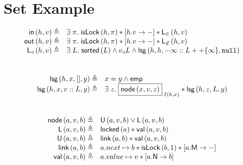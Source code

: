\section*{Set Example}
%
%
\[
\begin{array}{r l}
	\inSet{h}{v} \eqdef & \exsts{\pi} \isLock{h}{\pi} * \valueC{h}{v} * \inList{h}{v}\\
	\outSet{h}{v} \eqdef & \exsts{\pi} \isLock{h}{\pi} * \valueC{h}{v} * \outList{h}{v}\\
	\sortedList{\triangleleft}{h}{v} \eqdef & \exsts{L} \sorted{L} \land v  _\triangleleft L \land \lsg{h}{h}{-\infty:: L ++ \{\infty\} }{\nil}\\
%
\end{array}
\]\\
%
%
\[
\begin{array}{r l}
	
	\textsf{lsg}\left(h, x, [], y\right) \triangleq & x = y \land \textsf{emp}\\
	\textsf{lsg}\left(h, x, v:: L, y\right) \triangleq & \exists\; z.\; \boxed{\textsf{node}\left(x, v, z\right)}_{\; I(h, x)} * \textsf{lsg}\left(h, z, L, y\right)
\end{array}
\]\\
%
%
\[	
\begin{array}{r l}
	\node{a}{v}{b} \eqdef & \unlockedNode{a}{v}{b} \lor \lockedNode{a}{v}{b}\\ %
	\lockedNode{a}{v}{b} \eqdef & \locked{a} * \val{a}{v}{b}\\
	\unlockedNode{a}{v}{b} \eqdef & \link{a}{b} * \val{a}{v}{b}\\
	
	\link{a}{b} \eqdef & \cell{a.next}{b} * \isLock{b}{1} * \modC{a} \\
	\val{a}{v}{b} \eqdef & \cell{a.value}{v} * \nextC{a}{b}
\end{array}
\]\\
%
%

